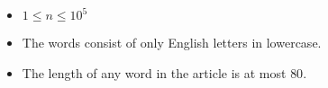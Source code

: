 \begin{itemize}
	\tightlist
	\item $1 \le n \le 10^5$
    \item The words consist of only English letters in lowercase.
    \item The length of any word in the article is at most $80$.
\end{itemize}


